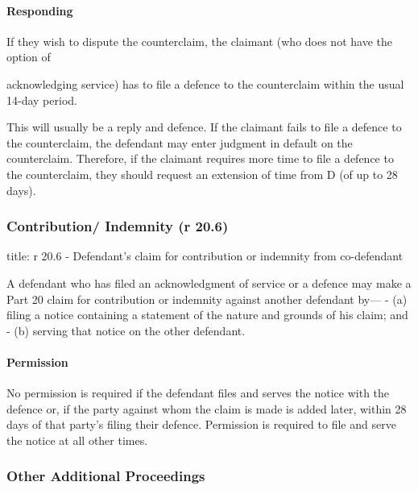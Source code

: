 \documentclass[
]{article}
\newenvironment{Shaded}{}{}
\newcommand{\NormalTok}[1]{#1}
\begin{document}
\hypertarget{responding}{%
\paragraph{Responding}\label{responding}}

If they wish to dispute the counterclaim, the claimant (who does not
have the option of

acknowledging service) has to file a defence to the counterclaim within
the usual 14-day period.

This will usually be a reply and defence. If the claimant fails to file
a defence to the counterclaim, the defendant may enter judgment in
default on the counterclaim. Therefore, if the claimant requires more
time to file a defence to the counterclaim, they should request an
extension of time from D (of up to 28 days).

\hypertarget{contribution-indemnity-r-20.6}{%
\subsubsection{Contribution/ Indemnity (r
20.6)}\label{contribution-indemnity-r-20.6}}

\begin{Shaded}
\begin{Highlighting}[]
\NormalTok{title: r 20.6 {-} Defendant’s claim for contribution or indemnity from co{-}defendant}

\NormalTok{A defendant who has filed an acknowledgment of service or a defence may make a Part 20 claim for contribution or indemnity against another defendant by—}
\NormalTok{{-} (a) filing a notice containing a statement of the nature and grounds of his claim; and}
\NormalTok{{-} (b) serving that notice on the other defendant.}
\end{Highlighting}
\end{Shaded}

\hypertarget{permission}{%
\paragraph{Permission}\label{permission}}

No permission is required if the defendant files and serves the notice
with the defence or, if the party against whom the claim is made is
added later, within 28 days of that party's filing their defence.
Permission is required to file and serve the notice at all other times.

\hypertarget{other-additional-proceedings}{%
\subsubsection{Other Additional
Proceedings}\label{other-additional-proceedings}}
\end{document}
